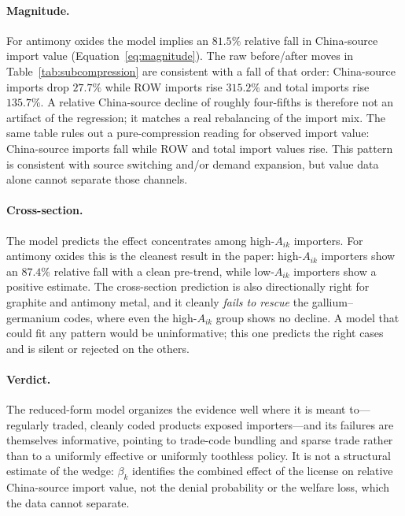 \documentclass[12pt,a4paper]{article}
\begin{document}
\paragraph{Magnitude.} For antimony oxides the model implies an $81.5\%$
relative fall in China-source import value (Equation~\ref{eq:magnitude}). The raw
before/after moves in Table~\ref{tab:subcompression} are consistent with a fall
of that order: China-source imports drop $27.7\%$ while ROW imports rise
$315.2\%$ and total imports rise $135.7\%$. A relative China-source decline of
roughly four-fifths is therefore not an artifact of the regression; it matches a
real rebalancing of the import mix. The same table rules out a pure-compression
reading for observed import value: China-source imports fall while ROW and total
import values rise. This pattern is consistent with source switching and/or
demand expansion, but value data alone cannot separate those channels.

\paragraph{Cross-section.} The model predicts the effect concentrates among
high-$A_{ik}$ importers. For antimony oxides this is the cleanest result in the
paper: high-$A_{ik}$ importers show an $87.4\%$ relative fall with a clean
pre-trend, while low-$A_{ik}$ importers show a positive estimate. The cross-section
prediction is also directionally right for graphite and antimony metal, and it
cleanly \emph{fails to rescue} the gallium--germanium codes, where even the
high-$A_{ik}$ group shows no decline. A model that could fit any pattern would be
uninformative; this one predicts the right cases and is silent or rejected on the
others.

\paragraph{Verdict.} The reduced-form model organizes the evidence well where it
is meant to---regularly traded, cleanly coded products exposed importers---and
its failures are themselves informative, pointing to trade-code bundling and
sparse trade rather than to a uniformly effective or uniformly toothless policy.
It is not a structural estimate of the wedge: $\beta_k$ identifies the combined
effect of the license on relative China-source import value, not the denial probability or
the welfare loss, which the data cannot separate.

\end{document}

